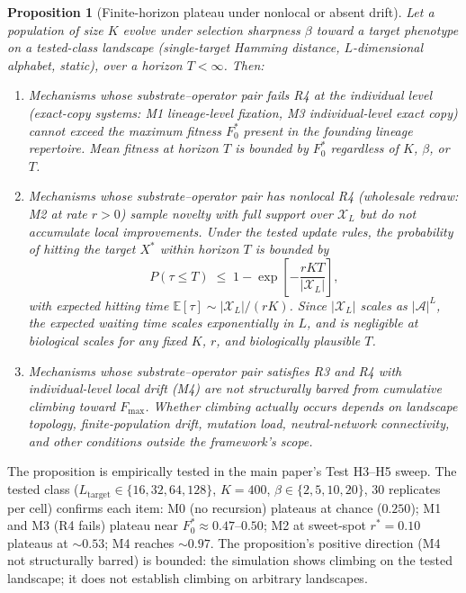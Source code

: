 \documentclass[11pt]{article}
\theoremstyle{plain}
\newtheorem{proposition}[theorem]{Proposition}
\theoremstyle{definition}
\newcommand{\Xset}{\mathcal{X}}
\begin{document}
\begin{proposition}[Finite-horizon plateau under nonlocal or absent drift]
\label{prop:supp_plateau}
Let a population of size $K$ evolve under selection sharpness $\beta$ toward a target phenotype on a tested-class landscape (single-target Hamming distance, $L$-dimensional alphabet, static), over a horizon $T < \infty$. Then:

\begin{enumerate}
\item Mechanisms whose substrate--operator pair fails R4 at the individual level (exact-copy systems: M1 lineage-level fixation, M3 individual-level exact copy) cannot exceed the maximum fitness $F_0^*$ present in the founding lineage repertoire. Mean fitness at horizon $T$ is bounded by $F_0^*$ regardless of $K$, $\beta$, or $T$.

\item Mechanisms whose substrate--operator pair has nonlocal R4 (wholesale redraw: M2 at rate $r > 0$) sample novelty with full support over $\Xset_L$ but do not accumulate local improvements. Under the tested update rules, the probability of hitting the target $X^*$ within horizon $T$ is bounded by
\[
P(\tau \le T) \;\le\; 1 - \exp\!\left[-\frac{r K T}{|\Xset_L|}\right],
\]
with expected hitting time $\mathbb{E}[\tau] \sim |\Xset_L|/(r K)$. Since $|\Xset_L|$ scales as $|\mathcal{A}|^L$, the expected waiting time scales exponentially in $L$, and is negligible at biological scales for any fixed $K$, $r$, and biologically plausible $T$.

\item Mechanisms whose substrate--operator pair satisfies R3 and R4 with individual-level local drift (M4) are not structurally barred from cumulative climbing toward $F_{\max}$. Whether climbing actually occurs depends on landscape topology, finite-population drift, mutation load, neutral-network connectivity, and other conditions outside the framework's scope.
\end{enumerate}
\end{proposition}

The proposition is empirically tested in the main paper's Test H3--H5 sweep. The tested class ($L_{\mathrm{target}} \in \{16, 32, 64, 128\}$, $K = 400$, $\beta \in \{2, 5, 10, 20\}$, 30 replicates per cell) confirms each item: M0 (no recursion) plateaus at chance ($0.250$); M1 and M3 (R4 fails) plateau near $F_0^* \approx 0.47\text{--}0.50$; M2 at sweet-spot $r^* = 0.10$ plateaus at $\sim 0.53$; M4 reaches $\sim 0.97$. The proposition's positive direction (M4 not structurally barred) is bounded: the simulation shows climbing on the tested landscape; it does not establish climbing on arbitrary landscapes.
\end{document}
